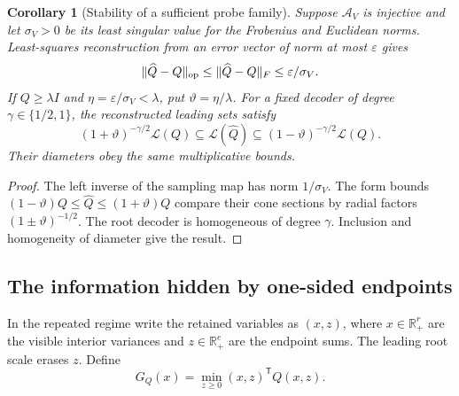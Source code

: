 \documentclass[11pt,reqno]{amsart}
\numberwithin{equation}{section}
\newtheorem{corollary}[theorem]{Corollary}
\theoremstyle{definition}
\theoremstyle{remark}
\newcommand{\R}{\mathbb R}
\newcommand{\cL}{\mathcal L}
\begin{document}
\begin{corollary}[Stability of a sufficient probe family]\label{cor:query-stability}
Suppose $\mathcal A_V$ is injective and let $\sigma_V>0$ be its least singular value for the Frobenius and Euclidean norms. Least-squares reconstruction from an error vector of norm at most $\varepsilon$ gives
\[
 \|\widehat Q-Q\|_{\rm op}\le\|\widehat Q-Q\|_F\le\varepsilon/\sigma_V.
\]
If $Q\ge\lambda I$ and $\eta=\varepsilon/\sigma_V<\lambda$, put $\vartheta=\eta/\lambda$. For a fixed decoder of degree $\gamma\in\{1/2,1\}$, the reconstructed leading sets satisfy
\[
 (1+\vartheta)^{-\gamma/2}\cL(Q)
 \subseteq\cL(\widehat Q)
 \subseteq(1-\vartheta)^{-\gamma/2}\cL(Q).
\]
Their diameters obey the same multiplicative bounds.
\end{corollary}
\begin{proof}
The left inverse of the sampling map has norm $1/\sigma_V$. The form bounds $(1-\vartheta)Q\le\widehat Q\le(1+\vartheta)Q$ compare their cone sections by radial factors $(1\pm\vartheta)^{-1/2}$. The root decoder is homogeneous of degree $\gamma$. Inclusion and homogeneity of diameter give the result.
\end{proof}

\subsection{The information hidden by one-sided endpoints}
In the repeated regime write the retained variables as $(x,z)$, where $x\in\R_+^r$ are the visible interior variances and $z\in\R_+^e$ are the endpoint sums. The leading root scale erases $z$. Define
\begin{equation}\label{eq:effective}
 G_Q(x)=\min_{z\ge0}(x,z)^{\mathsf T}Q(x,z).
\end{equation}
\end{document}
